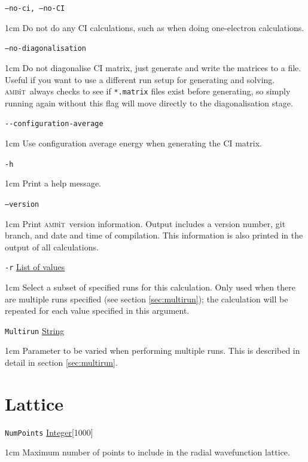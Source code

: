\documentclass{report}
\newcommand{\ambit}{\textsc{amb}{\footnotesize i}\textsc{t}}
\begin{document}
\texttt{--no-ci, --no-CI}
\begin{adjustwidth}{1cm}{}
Do not do any CI calculations, such as when doing one-electron calculations.
\end{adjustwidth}

\texttt{--no-diagonalisation}
\begin{adjustwidth}{1cm}{}
Do not diagonalise CI matrix, just generate and write the matrices to a file. Useful if you want to use a different run setup for generating and solving. \ambit\ always checks to see if \texttt{*.matrix} files exist before generating, so simply running again without this flag will move directly to the diagonalisation stage.
\end{adjustwidth}

\texttt{{-}{-}configuration-average}
\begin{adjustwidth}{1cm}{}
Use configuration average energy when generating the CI matrix.
\end{adjustwidth}

\texttt{-h}
\begin{adjustwidth}{1cm}{}
Print a help message.
\end{adjustwidth}

\texttt{--version}
\begin{adjustwidth}{1cm}{}
Print \ambit\ version information. Output includes a version number, git branch, and date and time of 
compilation. This information is also printed in the output of all calculations.
\end{adjustwidth}

\texttt{-r} \uline{List of values}
\begin{adjustwidth}{1cm}{}
Select a subset of specified runs for this calculation. Only used when there are multiple runs specified
(see section \ref{sec:multirun}); the calculation will be repeated for each value specified in this
argument.
\end{adjustwidth}

\texttt{Multirun} \uline{String}
\begin{adjustwidth}{1cm}{}
Parameter to be varied when performing multiple runs. This is described in detail in section
\ref{sec:multirun}.
\end{adjustwidth}

\section{Lattice}

\texttt{NumPoints} \uline{Integer}[1000]
\begin{adjustwidth}{1cm}{}
Maximum number of points to include in the radial wavefunction lattice.
\end{adjustwidth}
\end{document}
